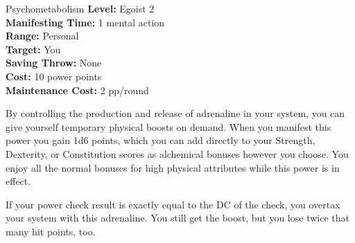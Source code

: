 {Psychometabolism}
{
	\textbf{Level:}
	Egoist 2\\
	\textbf{Manifesting Time:}
	1 mental action\\
	\textbf{Range:}
	Personal\\
	\textbf{Target:}
	You\\
	\textbf{Saving Throw:}
	None\\
	\textbf{Cost:}
	10 power points\\
	\textbf{Maintenance Cost:}
	2 pp/round\\
}
{
	By controlling the production and release of adrenaline in your system, you can give yourself temporary physical boosts on demand. When you manifest this power you gain 1d6 points, which you can add directly to your Strength, Dexterity, or Constitution scores as alchemical bonuses however you choose. You enjoy all the normal bonuses for high physical attributes while this power is in effect.

	If your power check result is exactly equal to the DC of the check, you overtax your system with this adrenaline. You still get the boost, but you lose twice that many hit points, too.
}
